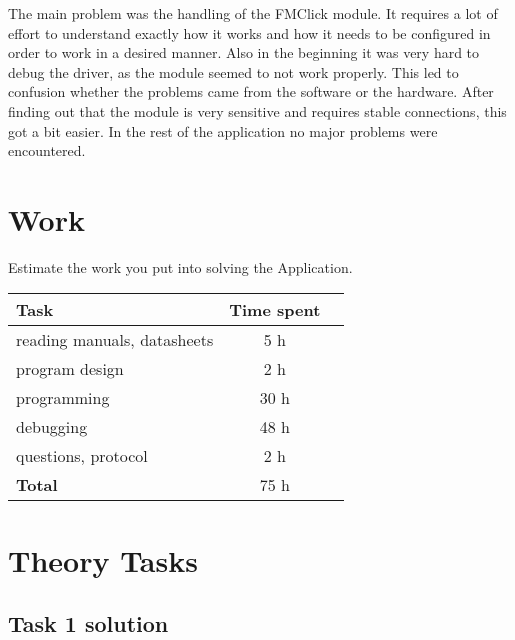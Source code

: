 \documentclass[12pt,a4paper,titlepage,oneside]{article}
\begin{document}
The main problem was the handling of the FMClick module. It 
requires a lot of effort to understand exactly how it works and how it needs
to be configured in order to work in a desired manner. Also in the beginning
it was very hard to debug the driver, as the module seemed to not work properly.
This led to confusion whether the problems came from the software or the hardware.
After finding out that the module is very sensitive and requires stable connections,
this got a bit easier. In the rest of the application no major problems were
encountered.

\section{Work}

Estimate the work you put into solving the Application.

\begin{tabular}{|l|c|c|}\hline
	Task & Time spent \\ \hline

	reading manuals, datasheets &  5 h\\
	program design              &  2 h\\
	programming                 & 30 h\\
	debugging                   & 48 h\\
	questions, protocol         &  2 h\\ \hline

	\textbf{Total}              & 75 h\\ \hline
\end{tabular}

\section{Theory Tasks}




\subsection{Task 1 solution}
\end{document}
